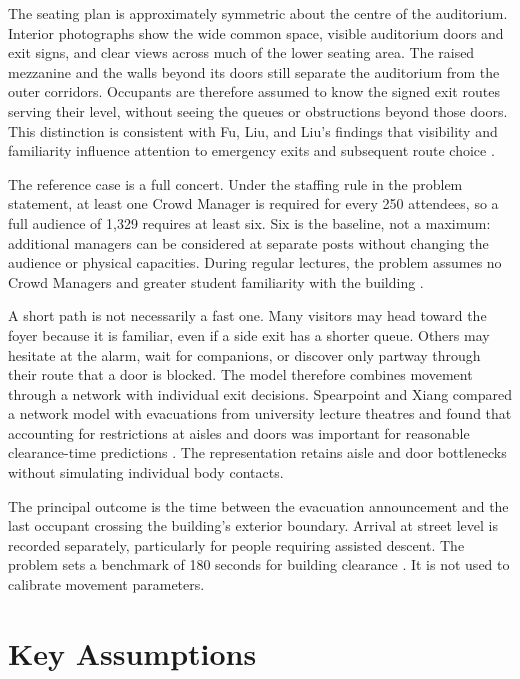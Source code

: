 \documentclass[11pt,a4paper]{article}
\begin{document}
The seating plan is approximately symmetric about the centre of the auditorium. Interior photographs show the wide common space, visible auditorium doors and exit signs, and clear views across much of the lower seating area. The raised mezzanine and the walls beyond its doors still separate the auditorium from the outer corridors. Occupants are therefore assumed to know the signed exit routes serving their level, without seeing the queues or obstructions beyond those doors. This distinction is consistent with Fu, Liu, and Liu's findings that visibility and familiarity influence attention to emergency exits and subsequent route choice \cite{brief,fu2023,fu2024}.

The reference case is a full concert. Under the staffing rule in the problem statement, at least one Crowd Manager is required for every 250 attendees, so a full audience of 1,329 requires at least six. Six is the baseline, not a maximum: additional managers can be considered at separate posts without changing the audience or physical capacities. During regular lectures, the problem assumes no Crowd Managers and greater student familiarity with the building \cite{brief}.

A short path is not necessarily a fast one. Many visitors may head toward the foyer because it is familiar, even if a side exit has a shorter queue. Others may hesitate at the alarm, wait for companions, or discover only partway through their route that a door is blocked. The model therefore combines movement through a network with individual exit decisions. Spearpoint and Xiang compared a network model with evacuations from university lecture theatres and found that accounting for restrictions at aisles and doors was important for reasonable clearance-time predictions \cite{spearpoint}. The representation retains aisle and door bottlenecks without simulating individual body contacts.

The principal outcome is the time between the evacuation announcement and the last occupant crossing the building's exterior boundary. Arrival at street level is recorded separately, particularly for people requiring assisted descent. The problem sets a benchmark of 180 seconds for building clearance \cite{brief}. It is not used to calibrate movement parameters.

\section{Key Assumptions}
\end{document}
